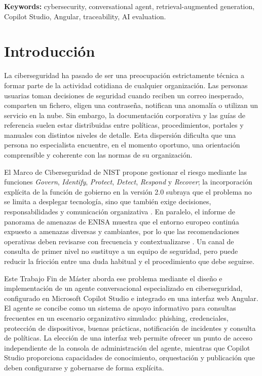 \documentclass[12pt,twoside,titlepage]{book}
\begin{document}
\vspace{0.4cm}
\noindent\textbf{Keywords:} cybersecurity, conversational agent, retrieval-augmented generation, Copilot Studio, Angular, traceability, AI evaluation.

\tableofcontents
\listoftables
\listoffigures
\lstlistoflistings

\mainmatter

\chapter{Introducción}
\label{chap:introduccion}

La ciberseguridad ha pasado de ser una preocupación estrictamente técnica a
formar parte de la actividad cotidiana de cualquier organización. Las personas
usuarias toman decisiones de seguridad cuando reciben un correo inesperado,
comparten un fichero, eligen una contraseña, notifican una anomalía o utilizan
un servicio en la nube. Sin embargo, la documentación corporativa y las guías
de referencia suelen estar distribuidas entre políticas, procedimientos,
portales y manuales con distintos niveles de detalle. Esta dispersión dificulta
que una persona no especialista encuentre, en el momento oportuno, una
orientación comprensible y coherente con las normas de su organización.

El Marco de Ciberseguridad de NIST propone gestionar el riesgo mediante las
funciones \emph{Govern}, \emph{Identify}, \emph{Protect}, \emph{Detect},
\emph{Respond} y \emph{Recover}; la incorporación explícita de la función de
gobierno en la versión 2.0 subraya que el problema no se limita a desplegar
tecnología, sino que también exige decisiones, responsabilidades y comunicación
organizativa \cite{nistCsf2024}. En paralelo, el informe de panorama de
amenazas de ENISA muestra que el entorno europeo continúa expuesto a amenazas
diversas y cambiantes, por lo que las recomendaciones operativas deben revisarse
con frecuencia y contextualizarse \cite{enisaThreat2025}. Un canal de consulta
de primer nivel no sustituye a un equipo de seguridad, pero puede reducir la
fricción entre una duda habitual y el procedimiento que debe seguirse.

Este Trabajo Fin de Máster aborda ese problema mediante el diseño e
implementación de un agente conversacional especializado en ciberseguridad,
configurado en Microsoft Copilot Studio e integrado en una interfaz web Angular.
El agente se concibe como un sistema de apoyo informativo para consultas
frecuentes en un escenario organizativo simulado: phishing, credenciales,
protección de dispositivos, buenas prácticas, notificación de incidentes y
consulta de políticas. La elección de una interfaz web permite ofrecer un punto
de acceso independiente de la consola de administración del agente, mientras
que Copilot Studio proporciona capacidades de conocimiento, orquestación y
publicación que deben configurarse y gobernarse de forma explícita.
\end{document}
